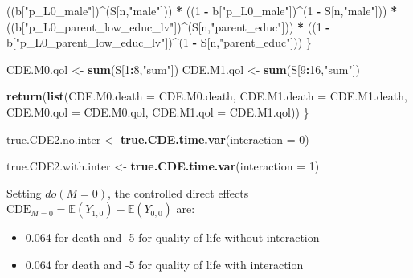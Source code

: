 \documentclass[
]{book}
\newenvironment{Shaded}{\begin{snugshade}}{\end{snugshade}}
\newcommand{\AttributeTok}[1]{\textcolor[rgb]{0.13,0.29,0.53}{#1}}
\newcommand{\DecValTok}[1]{\textcolor[rgb]{0.00,0.00,0.81}{#1}}
\newcommand{\FunctionTok}[1]{\textcolor[rgb]{0.13,0.29,0.53}{\textbf{#1}}}
\newcommand{\NormalTok}[1]{#1}
\newcommand{\OtherTok}[1]{\textcolor[rgb]{0.56,0.35,0.01}{#1}}
\newcommand{\SpecialCharTok}[1]{\textcolor[rgb]{0.81,0.36,0.00}{\textbf{#1}}}
\newcommand{\StringTok}[1]{\textcolor[rgb]{0.31,0.60,0.02}{#1}}
\providecommand{\tightlist}{%
  \setlength{\itemsep}{0pt}\setlength{\parskip}{0pt}}
\begin{document}
\begin{Shaded}
\begin{Highlighting}[]
\NormalTok{      ((b[}\StringTok{"p\_L0\_male"}\NormalTok{])}\SpecialCharTok{\^{}}\NormalTok{(S[n,}\StringTok{"male"}\NormalTok{])) }\SpecialCharTok{*} 
\NormalTok{      ((}\DecValTok{1} \SpecialCharTok{{-}}\NormalTok{ b[}\StringTok{"p\_L0\_male"}\NormalTok{])}\SpecialCharTok{\^{}}\NormalTok{(}\DecValTok{1} \SpecialCharTok{{-}}\NormalTok{ S[n,}\StringTok{"male"}\NormalTok{])) }\SpecialCharTok{*} 
\NormalTok{      ((b[}\StringTok{"p\_L0\_parent\_low\_educ\_lv"}\NormalTok{])}\SpecialCharTok{\^{}}\NormalTok{(S[n,}\StringTok{"parent\_educ"}\NormalTok{])) }\SpecialCharTok{*}
\NormalTok{      ((}\DecValTok{1} \SpecialCharTok{{-}}\NormalTok{ b[}\StringTok{"p\_L0\_parent\_low\_educ\_lv"}\NormalTok{])}\SpecialCharTok{\^{}}\NormalTok{(}\DecValTok{1} \SpecialCharTok{{-}}\NormalTok{ S[n,}\StringTok{"parent\_educ"}\NormalTok{])) }
\NormalTok{    \}}
  
\NormalTok{  CDE.M0.qol }\OtherTok{\textless{}{-}} \FunctionTok{sum}\NormalTok{(S[}\DecValTok{1}\SpecialCharTok{:}\DecValTok{8}\NormalTok{,}\StringTok{"sum"}\NormalTok{])}
\NormalTok{  CDE.M1.qol }\OtherTok{\textless{}{-}} \FunctionTok{sum}\NormalTok{(S[}\DecValTok{9}\SpecialCharTok{:}\DecValTok{16}\NormalTok{,}\StringTok{"sum"}\NormalTok{])}
  
  \FunctionTok{return}\NormalTok{(}\FunctionTok{list}\NormalTok{(}\AttributeTok{CDE.M0.death =}\NormalTok{ CDE.M0.death, }\AttributeTok{CDE.M1.death =}\NormalTok{ CDE.M1.death, }
              \AttributeTok{CDE.M0.qol =}\NormalTok{ CDE.M0.qol, }\AttributeTok{CDE.M1.qol =}\NormalTok{ CDE.M1.qol))}
\NormalTok{\}}
\end{Highlighting}
\end{Shaded}

\begin{Shaded}
\begin{Highlighting}[]
\NormalTok{true.CDE2.no.inter }\OtherTok{\textless{}{-}} \FunctionTok{true.CDE.time.var}\NormalTok{(}\AttributeTok{interaction =} \DecValTok{0}\NormalTok{)}

\NormalTok{true.CDE2.with.inter }\OtherTok{\textless{}{-}} \FunctionTok{true.CDE.time.var}\NormalTok{(}\AttributeTok{interaction =} \DecValTok{1}\NormalTok{)}
\end{Highlighting}
\end{Shaded}

Setting \(do(M=0)\), the controlled direct effects \(\text{CDE}_{M=0} = \mathbb{E}\left(Y_{1,0} \right) - \mathbb{E}\left(Y_{0,0} \right)\) are:

\begin{itemize}
\tightlist
\item
  0.064 for death and -5 for quality of life without interaction
\item
  0.064 for death and -5 for quality of life with interaction
\end{itemize}
\end{document}

